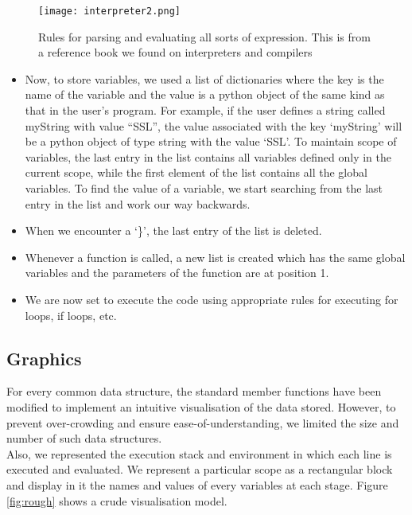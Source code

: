 \documentclass{article}
\begin{document}
\begin{figure}[H]
    \centering
    \texttt{[image: interpreter2.png]}
    \caption{Rules for parsing and evaluating all sorts of expression. This is from a reference book \cite{textbook} we found on interpreters and compilers}
    \label{fig:bookExtract2}
\end{figure}
\begin{itemize}
\item Now, to store variables, we used a list of dictionaries where the key is the name of the variable and the value is a python object of the same kind as that in the user's program. For example, if the user defines a string called myString with value ``SSL'', the value associated with the key `myString' will be a python object of type string with the value `SSL'. To maintain scope of variables, the last entry in the list contains all variables defined only in the current scope, while the first element of the list contains all the global variables. To find the value of a variable, we start searching from the last entry in the list and work our way backwards.
\item When we encounter a `\}', the last entry of the list is deleted.
\item Whenever a function is called, a new list is created which has the same global variables and the parameters of the function are at position 1.
\item We are now set to execute the code using appropriate rules for executing for loops, if loops, etc.
\end{itemize}

\subsection{Graphics}
For every common data structure, the standard member functions have been modified to implement an intuitive visualisation of the data stored. However, to prevent over-crowding and ensure ease-of-understanding, we limited the size and number of such data structures.\\
Also, we  represented the execution stack and environment in which each line is executed and evaluated. We represent a particular scope as a rectangular block and display in it the names and values of every variables at each stage. Figure \ref{fig:rough} shows a crude
visualisation model.
\end{document}

